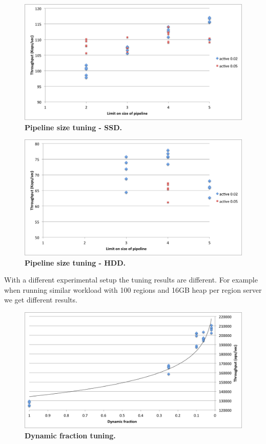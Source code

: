 {\begin{figure}[htb]
\includegraphics[width=\figw]{Figs/pipeline-1-ssd.png}
\caption{{\bf Pipeline size tuning - SSD.} 
}
\label{fig:pipeline-1-ssd}
\end{figure}

\begin{figure}[htb]
\includegraphics[width=\figw]{Figs/pipeline-1-hdd.png}
\caption{{\bf Pipeline size tuning - HDD.} 
}
\label{fig:pipeline-1-hdd}
\end{figure}

With a different experimental setup the tuning results are different.
For example when running similar workload with 100 regions and 16GB heap per region server we get different results.
\begin{figure}[htb]
\includegraphics[width=\figw]{Figs/dynamic-fraction-2.png}
\caption{{\bf Dynamic fraction tuning.} 
}
\label{fig:dynamic-fraction-2}
\end{figure}

}
